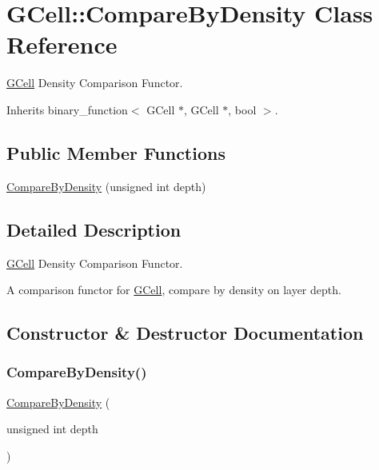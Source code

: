 \hypertarget{classKatabatic_1_1GCell_1_1CompareByDensity}{}\section{G\+Cell\+:\+:Compare\+By\+Density Class Reference}
\label{classKatabatic_1_1GCell_1_1CompareByDensity}


\hyperlink{classKatabatic_1_1GCell}{G\+Cell} Density Comparison Functor.  




Inherits binary\+\_\+function$<$ G\+Cell $\ast$, G\+Cell $\ast$, bool $>$.

\subsection*{Public Member Functions}
\begin{DoxyCompactItemize}
\item 
\hyperlink{classKatabatic_1_1GCell_1_1CompareByDensity_a3a51c3a473276097f23c5f58c6800f9b}{Compare\+By\+Density} (unsigned int depth)
\end{DoxyCompactItemize}


\subsection{Detailed Description}
\hyperlink{classKatabatic_1_1GCell}{G\+Cell} Density Comparison Functor. 

A comparison functor for \hyperlink{classKatabatic_1_1GCell}{G\+Cell}, compare by density on layer {\ttfamily depth}. 

\subsection{Constructor \& Destructor Documentation}
\mbox{\label{classKatabatic_1_1GCell_1_1CompareByDensity_a3a51c3a473276097f23c5f58c6800f9b}} 
\subsubsection{\texorpdfstring{Compare\+By\+Density()}{CompareByDensity()}}
{\footnotesize\ttfamily \hyperlink{classKatabatic_1_1GCell_1_1CompareByDensity}{Compare\+By\+Density} (\begin{DoxyParamCaption}\item[{unsigned int}]{depth }\end{DoxyParamCaption})}

